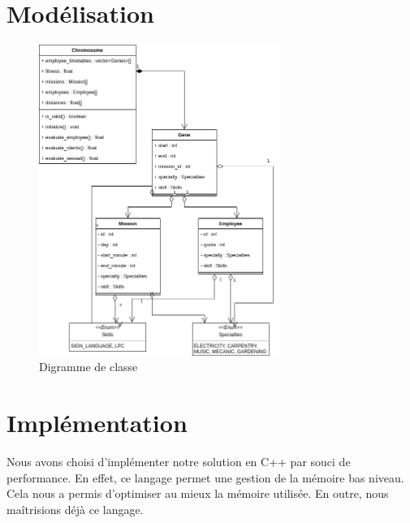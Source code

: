 \documentclass{article}
\begin{document}
\newpage
\newpage

\section{Modélisation}
        \begin{figure}[h]
        \centering
        \includegraphics[width=0.7\textwidth]{class_diagram.png}
        \caption{\label{fig:class_diagram}Digramme de classe}
        \end{figure}
\newpage
\section{Implémentation}
    Nous avons choisi d'implémenter notre solution en C++ par souci de performance. En effet, ce langage permet une gestion de la mémoire bas niveau. Cela nous a permis d'optimiser au mieux la mémoire utilisée. En outre, nous maîtrisions déjà ce langage. 
\end{document}
